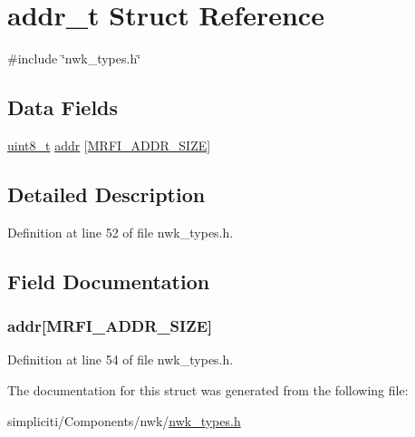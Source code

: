\hypertarget{structaddr__t}{\section{addr\-\_\-t \-Struct \-Reference}
\label{structaddr__t}
}


{\ttfamily \#include \char`\"{}nwk\-\_\-types.\-h\char`\"{}}

\subsection*{\-Data \-Fields}
\begin{DoxyCompactItemize}
\item 
\hyperlink{bsp__msp430__defs_8h_aba7bc1797add20fe3efdf37ced1182c5}{uint8\-\_\-t} \hyperlink{structaddr__t_a774858e8a0bebe3dc06db9e8e64b2051}{addr} \mbox{[}\hyperlink{mrfi_8h_a5491e55db4c46a461c9e86faa9e0a9b1}{\-M\-R\-F\-I\-\_\-\-A\-D\-D\-R\-\_\-\-S\-I\-Z\-E}\mbox{]}
\end{DoxyCompactItemize}


\subsection{\-Detailed \-Description}


\-Definition at line 52 of file nwk\-\_\-types.\-h.



\subsection{\-Field \-Documentation}
\hypertarget{structaddr__t_a774858e8a0bebe3dc06db9e8e64b2051}{
\subsubsection[{addr}]{ {\bf addr}\mbox{[}{\bf \-M\-R\-F\-I\-\_\-\-A\-D\-D\-R\-\_\-\-S\-I\-Z\-E}\mbox{]}}}\label{structaddr__t_a774858e8a0bebe3dc06db9e8e64b2051}


\-Definition at line 54 of file nwk\-\_\-types.\-h.



\-The documentation for this struct was generated from the following file\-:\begin{DoxyCompactItemize}
\item 
simpliciti/\-Components/nwk/\hyperlink{nwk__types_8h}{nwk\-\_\-types.\-h}\end{DoxyCompactItemize}
